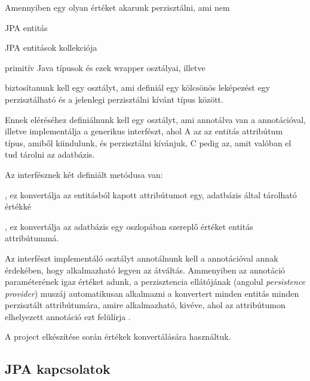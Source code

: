 Amennyiben egy olyan értéket akarunk perzisztálni, ami nem

\begin{listing}
	\item JPA entitás
	\item JPA entitások kollekciója
	\item primitív Java típusok és ezek wrapper osztályai, illetve 
\end{listing}

\noindent biztosítanunk kell egy osztályt, ami definiál egy kölcsönös leképezést egy perzisztálható és a jelenlegi perzisztálni kívánt típus között. \par

Ennek eléréséhez definiálnunk kell egy osztályt, ami annotálva van a  annotációval, illetve implementálja a  generikus interfészt, ahol A az az entitás attribútum típus, amiből kiindulunk, és perzisztálni kívánjuk, C pedig az, amit valóban el tud tárolni az adatbázis. \par

Az  interfésznek két definiált metódusa van:

\begin{listing}
	\item {}, ez konvertálja az entitásból kapott attribútumot egy, adatbázis által tárolható értékké
	\item {}, ez konvertálja az adatbázis egy oszlopában szereplő értéket entitás attribútummá.
\end{listing}

Az interfészt implementáló osztályt annotálnunk kell a  annotációval annak érdekében, hogy alkalmazható legyen az átváltás. Ammenyiben az annotáció  paraméterének igaz értéket adunk, a perzisztencia ellátójának (angolul \emph{persistence provider}) muszáj automatikusan alkalmazni a konvertert minden entitás minden perzisztált attribútumára, amire alkalmazható, kivéve, ahol az attribútumon elhelyezett  annotáció ezt felülírja \cite{converterDocumentation}.

A project elkészítése során  értékek konvertálására használtuk.


\subsection{JPA kapcsolatok}

